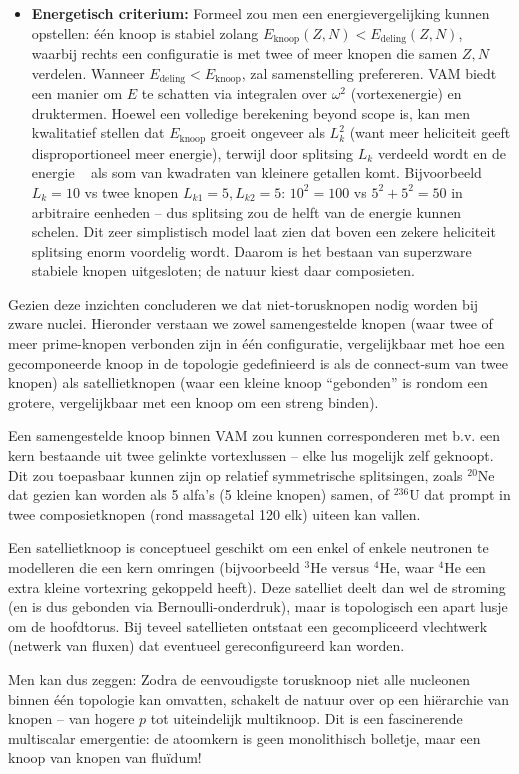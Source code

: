 \begin{itemize}
    \item \textbf{Energetisch criterium:} Formeel zou men een energievergelijking kunnen opstellen: één knoop is stabiel zolang $E_{\text{knoop}}(Z,N) < E_{\text{deling}}(Z,N)$, waarbij rechts een configuratie is met twee of meer knopen die samen $Z,N$ verdelen. Wanneer $E_{\text{deling}} < E_{\text{knoop}}$, zal samenstelling prefereren. VAM biedt een manier om $E$ te schatten via integralen over $\omega^2$ (vortexenergie) en druktermen. Hoewel een volledige berekening beyond scope is, kan men kwalitatief stellen dat $E_{\text{knoop}}$ groeit ongeveer als $L_k^2$ (want meer heliciteit geeft disproportioneel meer energie), terwijl door splitsing $L_k$ verdeeld wordt en de energie ~ als som van kwadraten van kleinere getallen komt. Bijvoorbeeld $L_k=10$ vs twee knopen $L_{k1}=5, L_{k2}=5$: $10^2 =100$ vs $5^2+5^2=50$ in arbitraire eenheden – dus splitsing zou de helft van de energie kunnen schelen. Dit zeer simplistisch model laat zien dat boven een zekere heliciteit splitsing enorm voordelig wordt. Daarom is het bestaan van superzware stabiele knopen uitgesloten; de natuur kiest daar composieten.
\end{itemize}

Gezien deze inzichten concluderen we dat niet-torusknopen nodig worden bij zware nuclei. Hieronder verstaan we zowel samengestelde knopen (waar twee of meer prime-knopen verbonden zijn in één configuratie, vergelijkbaar met hoe een gecomponeerde knoop in de topologie gedefinieerd is als de connect-sum van twee knopen) als satellietknopen (waar een kleine knoop “gebonden” is rondom een grotere, vergelijkbaar met een knoop om een streng binden).

Een samengestelde knoop binnen VAM zou kunnen corresponderen met b.v. een kern bestaande uit twee gelinkte vortexlussen – elke lus mogelijk zelf geknoopt. Dit zou toepasbaar kunnen zijn op relatief symmetrische splitsingen, zoals $^{20}$Ne dat gezien kan worden als 5 alfa’s (5 kleine knopen) samen, of $^{236}$U dat prompt in twee composietknopen (rond massagetal 120 elk) uiteen kan vallen.

Een satellietknoop is conceptueel geschikt om een enkel of enkele neutronen te modelleren die een kern omringen (bijvoorbeeld $^3$He versus $^4$He, waar $^4$He een extra kleine vortexring gekoppeld heeft). Deze satelliet deelt dan wel de stroming (en is dus gebonden via Bernoulli-onderdruk), maar is topologisch een apart lusje om de hoofdtorus. Bij teveel satellieten ontstaat een gecompliceerd vlechtwerk (netwerk van fluxen) dat eventueel gereconfigureerd kan worden.

Men kan dus zeggen: Zodra de eenvoudigste torusknoop niet alle nucleonen binnen één topologie kan omvatten, schakelt de natuur over op een hiërarchie van knopen – van hogere $p$ tot uiteindelijk multiknoop. Dit is een fascinerende multiscalar emergentie: de atoomkern is geen monolithisch bolletje, maar een knoop van knopen van fluïdum!